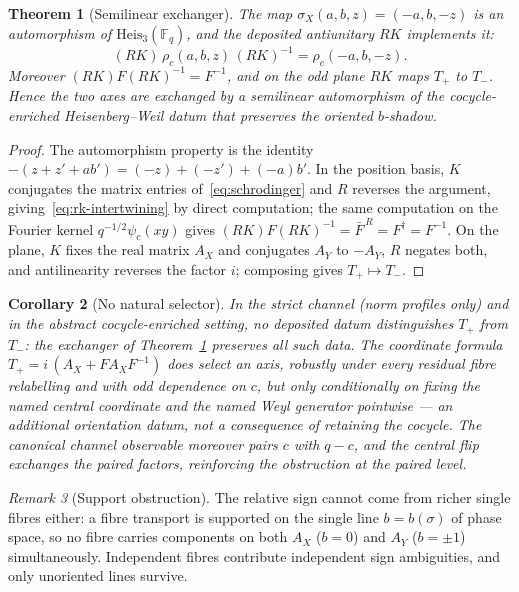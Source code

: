 \documentclass[11pt,a4paper]{article}
\newtheorem{theorem}{Theorem}[section]
\newtheorem{corollary}[theorem]{Corollary}
\theoremstyle{definition}
\theoremstyle{remark}
\newtheorem{remark}[theorem]{Remark}
\newcommand{\Fq}{\mathbb{F}_q}
\newcommand{\Heis}{\mathrm{Heis}_3(\Fq)}
\newcommand{\AX}{A_{X}}
\newcommand{\AY}{A_{Y}}
\begin{document}
\begin{theorem}[Semilinear exchanger]
  \label{thm:exchanger}
  The map $\sigma_X(a,b,z)=(-a,b,-z)$ is an automorphism of $\Heis$, and the deposited
  antiunitary $RK$ implements it:
  \begin{equation}
    (RK)\,\rho_c(a,b,z)\,(RK)^{-1}=\rho_c(-a,b,-z).
    \label{eq:rk-intertwining}
  \end{equation}
  Moreover $(RK)F(RK)^{-1}=F^{-1}$, and on the odd plane
  $RK$ maps $T_+$ to $T_-$.
  Hence the two axes are exchanged by a semilinear automorphism of the cocycle-enriched
  Heisenberg--Weil datum that preserves the oriented $b$-shadow.
\end{theorem}

\begin{proof}
  The automorphism property is the identity $-(z+z'+ab')=(-z)+(-z')+(-a)b'$.
  In the position basis, $K$ conjugates the matrix entries of~\eqref{eq:schrodinger} and
  $R$ reverses the argument, giving~\eqref{eq:rk-intertwining} by direct computation;
  the same computation on the Fourier kernel $q^{-1/2}\psi_c(xy)$ gives
  $(RK)F(RK)^{-1}=\bar F^{\,R}=F^\dagger=F^{-1}$.
  On the plane, $K$ fixes the real matrix $\AX$ and conjugates $\AY$ to $-\AY$, $R$
  negates both, and antilinearity reverses the factor $i$; composing gives
  $T_+\mapsto T_-$.
\end{proof}

\begin{corollary}[No natural selector]
  \label{cor:no-selector}
  In the strict channel (norm profiles only) and in the abstract cocycle-enriched
  setting, no deposited datum distinguishes $T_+$ from $T_-$: the exchanger of
  Theorem~\ref{thm:exchanger} preserves all such data.
  The coordinate formula $T_+=i\,(\AX+F\AX F^{-1})$ does select an axis, robustly under
  every residual fibre relabelling and with odd dependence on $c$, but only conditionally
  on fixing the named central coordinate and the named Weyl generator pointwise --- an
  additional orientation datum, not a consequence of retaining the cocycle.
  The canonical channel observable moreover pairs $c$ with $q-c$, and the central flip
  exchanges the paired factors, reinforcing the obstruction at the paired level.
\end{corollary}

\begin{remark}[Support obstruction]
  \label{rem:support}
  The relative sign cannot come from richer single fibres either: a fibre transport is
  supported on the single line $b=b(\sigma)$ of phase space, so no fibre carries
  components on both $\AX$ ($b=0$) and $\AY$ ($b=\pm1$) simultaneously.
  Independent fibres contribute independent sign ambiguities, and only unoriented lines
  survive.
\end{remark}
\end{document}
